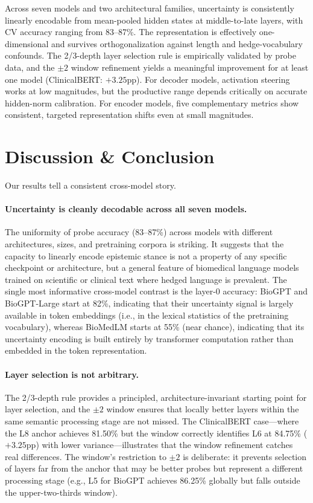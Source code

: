 \documentclass[11pt,a4paper]{article}
\begin{document}
Across seven models and two architectural families, uncertainty is
consistently linearly encodable from mean-pooled hidden states at
middle-to-late layers, with CV accuracy ranging from 83--87\%. The
representation is effectively one-dimensional and survives
orthogonalization against length and hedge-vocabulary confounds. The
2/3-depth layer selection rule is empirically validated by probe data,
and the $\pm 2$ window refinement yields a meaningful improvement for at
least one model (ClinicalBERT: $+3.25$pp). For decoder models, activation
steering works at low magnitudes, but the productive range depends
critically on accurate hidden-norm calibration. For encoder models, five
complementary metrics show consistent, targeted representation shifts even
at small magnitudes.

\section{Discussion \& Conclusion}

Our results tell a consistent cross-model story.

\paragraph{Uncertainty is cleanly decodable across all seven models.}
The uniformity of probe accuracy (83--87\%) across models with different
architectures, sizes, and pretraining corpora is striking. It suggests
that the capacity to linearly encode epistemic stance is not a property
of any specific checkpoint or architecture, but a general feature of
biomedical language models trained on scientific or clinical text where
hedged language is prevalent. The single most informative cross-model
contrast is the layer-0 accuracy: BioGPT and BioGPT-Large start at
82\%, indicating that their uncertainty signal is largely available in
token embeddings (i.e., in the lexical statistics of the pretraining
vocabulary), whereas BioMedLM starts at 55\% (near chance), indicating
that its uncertainty encoding is built entirely by transformer
computation rather than embedded in the token representation.

\paragraph{Layer selection is not arbitrary.}
The 2/3-depth rule provides a principled, architecture-invariant
starting point for layer selection, and the $\pm 2$ window ensures that
locally better layers within the same semantic processing stage are not
missed. The ClinicalBERT case---where the L8 anchor achieves 81.50\%
but the window correctly identifies L6 at 84.75\% ($+3.25$pp) with lower
variance---illustrates that the window refinement catches real
differences. The window's restriction to $\pm 2$ is deliberate: it
prevents selection of layers far from the anchor that may be better
probes but represent a different processing stage (e.g., L5 for BioGPT
achieves 86.25\% globally but falls outside the upper-two-thirds window).
\end{document}
